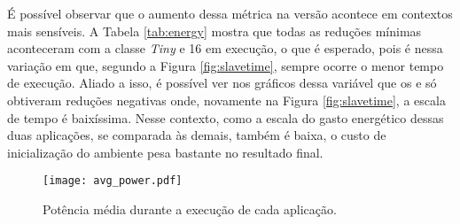 \begin{table}[h]
\centering
\caption{Reduções ao comparar-se o gasto energético total.}
\label{tab:energy}
\end{table}

É possível observar que o aumento dessa métrica na versão \ASYNC acontece em contextos mais sensíveis. A Tabela \ref{tab:energy} mostra que todas as reduções mínimas aconteceram com a classe \textit{Tiny} e 16 \clusters em execução, o que é esperado, pois é nessa variação em que, segundo a Figura \ref{fig:slavetime}, sempre ocorre o menor tempo de execução. Aliado a isso, é possível ver nos gráficos dessa variável que os  \FAST e \GF só obtiveram reduções negativas onde, novamente na Figura \ref{fig:slavetime}, a escala de tempo é baixíssima. Nesse contexto, como a escala do gasto energético dessas duas aplicações, se comparada às demais, também é baixa, o custo de inicialização do ambiente \ASYNC pesa bastante no resultado final.

\begin{figure}[h]
  \centering
  \caption{Potência média durante a execução de cada aplicação.}
  \label{fig:avgpower}
  \texttt{[image: avg\_power.pdf]}
\end{figure}

